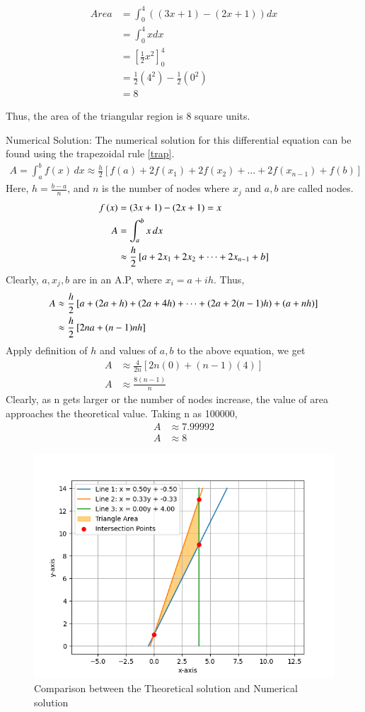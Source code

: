 \documentclass[journal]{IEEEtran}
\begin{document}
	\begin{align}
	Area &= \int_0^4 ((3x+1) - (2x+1)) dx \\ &=\int_0^4 x dx \\&= \left[ \frac{1}{2}x^2 \right]_0^4 \\&= \frac{1}{2}(4^2) - \frac{1}{2}(0^2) \\&= 8
	\end{align}
	
	Thus, the area of the triangular region is 8 square units.

	Numerical Solution:\newline
	The numerical solution for this differential equation can be found using the trapezoidal rule \eqref{trap}.
	\begin{align}
		A  = \int_a^b f(x) \, dx \approx \frac{h}{2} \left[ f(a) + 2f(x_1) + 2f(x_2) + \dots + 2f(x_{n-1}) + f(b) \right]
		\label{trap}
	\end{align}
	Here, $h = \frac{b-a}{n}$, and $n$ is the number of nodes where $x_j$ and $a,b$ are called nodes.
	\begin{align}
		f\left(x\right) &= (3x+1) - (2x+1) = x\\
		A &= \int_a^b x \, dx \\ &\approx \frac{h}{2} \left[ a + 2x_1 + 2x_2 + \dots + 2x_{n-1} + b \right]
	\end{align}
	Clearly, $a, x_j, b $ are in an A.P, where $x_i = a+ih$. Thus,
	\begin{align}
		A &\approx \frac{h}{2} \left[ a + \left(2a+ h\right) + \left(2a + 4h\right) + \dots + \left(2a + 2(n-1)h\right) + \left(a + nh\right) \right] \\
		&\approx \frac{h}{2} \left[ 2na + (n-1)nh \right]
	\end{align}
	Apply definition of $h$ and values of $a,b$ to the above equation, we get
	\begin{align}
		A &\approx \frac{4}{2n} \left[ 2n(0) + (n-1)(4) \right]\\
		A&\approx \frac{8(n-1)}{n}
	\end{align} 
	Clearly, as n gets larger or the number of nodes increase, the value of area approaches the theoretical value. Taking n as 100000,
			\begin{align}
				A &\approx 7.99992 \\ A &\approx 8
			\end{align} 
	\begin{figure}[h!]
		\centering
		\includegraphics[width=\columnwidth]{figs/fig1.png}
		\caption{Comparison between the Theoretical solution and Numerical solution}
		\label{stemplot}
	\end{figure}
\end{document}
